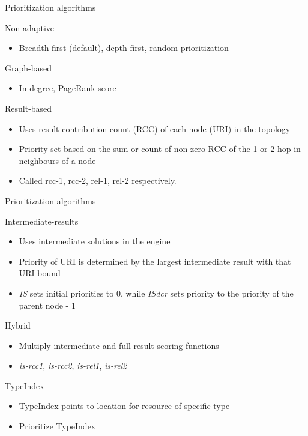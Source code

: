 
\begin{frame}{Prioritization algorithms}
  \begin{block}{Non-adaptive}
    \begin{itemize}
        \item Breadth-first (default), depth-first, random prioritization
    \end{itemize}
  \end{block}
  \begin{block}{Graph-based}
        \begin{itemize}
        \item In-degree, PageRank score
    \end{itemize}
  \end{block}
  \begin{block}{Result-based}
        \begin{itemize}
        \item Uses result contribution count (RCC) of each node (URI) in the topology
        \item Priority set based on the sum or count of non-zero RCC of the 1 or 2-hop in-neighbours of a node
        \item Called rcc-1, rcc-2, rel-1, rel-2 respectively. 
    \end{itemize}
  \end{block}
\end{frame}

\begin{frame}{Prioritization algorithms}
  \begin{block}{Intermediate-results}
        \begin{itemize}
        \item Uses intermediate solutions in the engine
        \item Priority of URI is determined by the largest intermediate result with that URI bound
        \item \emph{IS} sets initial priorities to 0, while \emph{ISdcr} sets priority to the priority of the parent node - 1
    \end{itemize}
  \end{block}
  \begin{block}{Hybrid}
        \begin{itemize}
        \item Multiply intermediate and full result scoring functions
        \item \emph{is-rcc1}, \emph{is-rcc2}, \emph{is-rel1}, \emph{is-rel2} 
    \end{itemize}
  \end{block}
  \begin{block}{TypeIndex}
        \begin{itemize}
        \item TypeIndex points to location for resource of specific type
        \item Prioritize TypeIndex
    \end{itemize}
  \end{block}
\end{frame}


